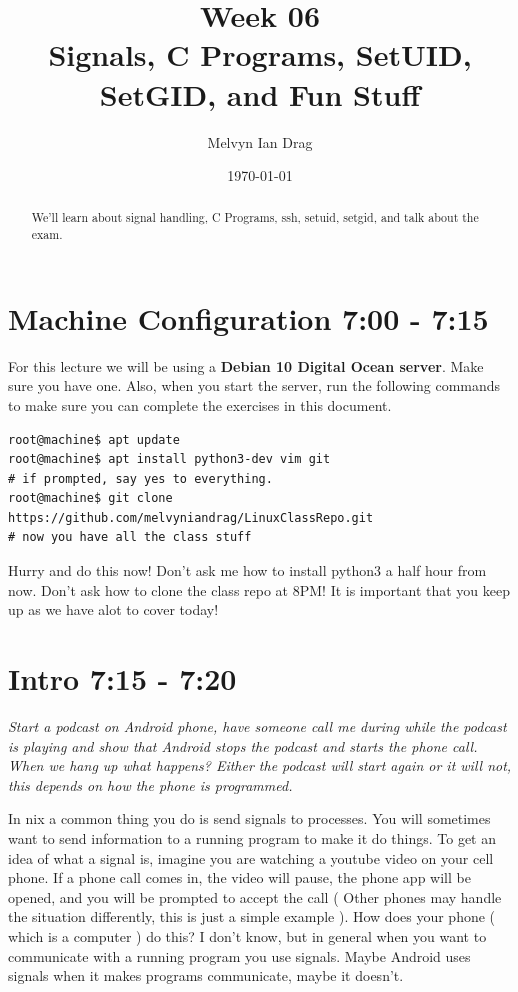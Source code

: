 \documentclass[8pt]{article}
\title{\textbf{Week 06} \\
\Large Signals, C Programs, SetUID, SetGID, and Fun Stuff }
\author{
	Melvyn Ian Drag
}
\date{\today}
\begin{document}
\maketitle

\begin{abstract}
We'll learn about signal handling, C Programs, ssh, setuid, setgid, and talk about the exam.
\end{abstract}

\section{Machine Configuration 7:00 - 7:15}
For this lecture we will be using a \textbf{Debian 10 Digital Ocean server}.
Make sure you have one. Also, when you start the server, run the following
commands to make sure you can complete the exercises in this document.

\begin{lstlisting}[style=term]
root@machine$ apt update
root@machine$ apt install python3-dev vim git
# if prompted, say yes to everything.
root@machine$ git clone https://github.com/melvyniandrag/LinuxClassRepo.git
# now you have all the class stuff
\end{lstlisting}

{\Large Hurry and do this now! Don't ask me how to install python3 a half hour
from now. Don't ask how to clone the class repo at 8PM! It is important that you
keep up as we have alot to cover today!}

\section{Intro 7:15 - 7:20}

\textit{Start a podcast on Android phone, have someone call me during while the
podcast is playing and show that Android stops the podcast and starts the phone
call. When we hang up what happens? Either the podcast will start again or it
will not, this depends on how the phone is programmed.}

In \*nix a common thing you do is send signals to processes. You will sometimes
want to send information to a running program to make it do things. To get an
idea of what a signal is, imagine you are watching a youtube video on your
cell phone. If a phone call comes in, the video will pause, the phone app will
be opened, and you will be prompted to accept the call ( Other phones may
handle the situation differently, this is just a simple example ). How does your
phone ( which is a computer ) do this? I don't know, but in general when you
want to communicate with a running program you use signals. Maybe Android uses
signals when it makes programs communicate, maybe it doesn't.
\end{document}
